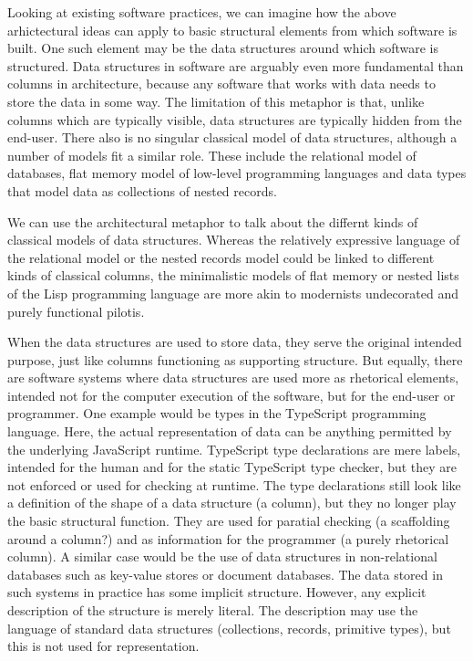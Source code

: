 Looking at existing software practices, we can imagine how the above arhictectural ideas
can apply to basic structural elements from which software is built. One such element may
be the data structures around which software is structured. Data structures
in software are arguably even more fundamental than columns in architecture, because any
software that works with data needs to store the data in some way. The limitation of this
metaphor is that, unlike columns which are typically visible, data structures are typically
hidden from the end-user. There also is no singular classical model of data structures,
although a number of models fit a similar role. These include the relational model of databases,
flat memory model of low-level programming languages and data types that model data as collections
of nested records.

We can use the architectural metaphor to talk about the differnt kinds of classical models
of data structures. Whereas the relatively expressive language of the relational model or
the nested records model could be linked to different kinds of classical columns, the minimalistic
models of flat memory or nested lists of the Lisp programming language are more akin to
modernists undecorated and purely functional pilotis.

When the data structures are used to store data, they serve the original intended purpose,
just like columns functioning as supporting structure. But equally, there are software systems
where data structures are used more as rhetorical elements, intended not for the computer
execution of the software, but for the end-user or programmer. One example would be types
in the TypeScript programming language. Here, the actual representation of data can be anything
permitted by the underlying JavaScript runtime. TypeScript type declarations are mere labels,
intended for the human and for the static TypeScript type checker, but they are not enforced or
used for checking at runtime. The type declarations still look like a definition of the shape
of a data structure (a column), but they no longer play the basic structural function. They are
used for paratial checking (a scaffolding around a column?) and as information for the
programmer (a purely rhetorical column). A similar case would be the use of data structures
in non-relational databases such as key-value stores or document databases. The data stored
in such systems in practice has some implicit structure.  However, any explicit description
of the structure is merely literal. The description may use the language of standard data
structures (collections, records, primitive types), but this is not used for representation.

